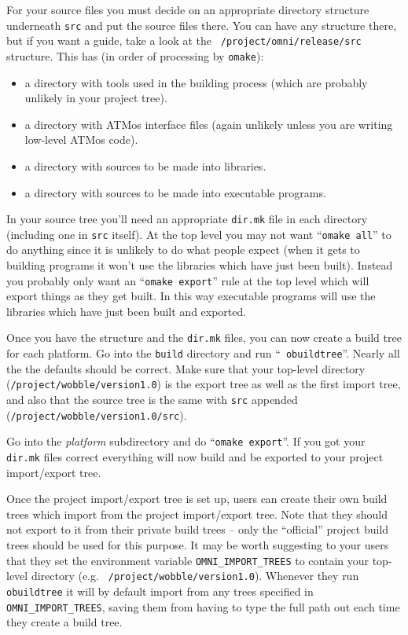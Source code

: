 \documentclass[11pt,twoside,onecolumn]{article}
\begin{document}
For your source files you must decide on an appropriate directory structure
underneath {\tt src} and put the source files there.  You can have any
structure there, but if you want a guide, take a look at the {\tt
/project/omni/release/src} structure.  This has (in order of processing by
{\tt omake}):
\begin{itemize}
\item a directory with tools used in the building process (which are probably
unlikely in your project tree).
\item a directory with ATMos interface files (again unlikely unless you are
writing low-level ATMos code).
\item a directory with sources to be made into libraries.
\item a directory with sources to be made into executable programs.
\end{itemize}
In your source tree you'll need an appropriate {\tt dir.mk} file in each
directory (including one in {\tt src} itself).  At the top level you may not
want ``{\tt omake all}'' to do anything since it is unlikely to do what people
expect (when it gets to building programs it won't use the libraries which have
just been built).  Instead you probably only want an ``{\tt omake export}''
rule at the top level which will export things as they get built.  In this way
executable programs will use the libraries which have just been built and
exported.

Once you have the structure and the {\tt dir.mk} files, you can now create a
build tree for each platform.  Go into the {\tt build} directory and run ``{\tt
obuildtree}''.  Nearly all the the defaults should be correct.  Make sure that
your top-level directory ({\tt /project/wobble/version1.0}) is the export tree
as well as the first import tree, and also that the source tree is the same
with {\tt src} appended ({\tt /project/wobble/version1.0/src}).

Go into the {\it platform} subdirectory and do ``{\tt omake export}''.  If you
got your {\tt dir.mk} files correct everything will now build and be exported
to your project import/export tree.

Once the project import/export tree is set up, users can create their own build
trees which import from the project import/export tree.  Note that they should
not export to it from their private build trees -- only the ``official''
project build trees should be used for this purpose.  It may be worth
suggesting to your users that they set the environment variable
\verb|OMNI_IMPORT_TREES| to contain your top-level directory (e.g. {\tt
/project/wobble/version1.0}).  Whenever they run {\tt obuildtree} it will by
default import from any trees specified in \verb|OMNI_IMPORT_TREES|, saving
them from having to type the full path out each time they create a build tree.
\end{document}
